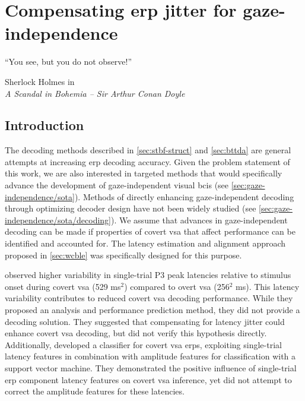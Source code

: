 \chapter{Compensating \acs{erp} jitter for gaze-independence}%
\label{sec:covert-align}
\epigraph{``You see, but you do not observe!''}{Sherlock Holmes in  \\ \emph{A
Scandal in Bohemia -- Sir Arthur Conan Doyle}}

\section{Introduction}

The decoding methods described in \cref{sec:stbf-struct} and
\cref{sec:bttda} are general attempts at increasing \ac{erp} decoding accuracy.
Given the problem statement of this work, we are also interested in targeted
methods that would specifically advance the development of gaze-independent
visual \acp{bci} (see \cref{sec:gaze-independence/sota}).
Methods of directly enhancing gaze-independent decoding through optimizing
decoder design have not been widely studied (see
\cref{sec:gaze-independence/sota/decoding}).
We assume that advances in gaze-independent decoding can be made if properties
of covert \ac{vsa} that affect performance can be identified and accounted for.
The latency estimation and alignment approach proposed in \cref{sec:wcble}
was specifically designed for this purpose.

\textcite{Arico2014} observed higher variability in single-trial P3 peak
latencies relative to stimulus onset during covert \ac{vsa} (529 ms$^2$) compared to overt
\ac{vsa} (256$^2$ ms).
This latency variability contributes to reduced covert \ac{vsa} decoding performance.
While they proposed an analysis and performance prediction method, they did not provide a
decoding solution.
They suggested that compensating for latency jitter could enhance covert \ac{vsa}
decoding, but did not verify this hypothesis directly.
Additionally, \textcite{Hardiansyah2020} developed a classifier for
covert \ac{vsa} \acp{erp}, exploiting single-trial latency features in combination with
amplitude features for classification with a support vector machine.
They demonstrated the positive influence of single-trial \ac{erp} component latency
features on covert \ac{vsa} inference, yet did not attempt to correct the amplitude
features for these latencies.

